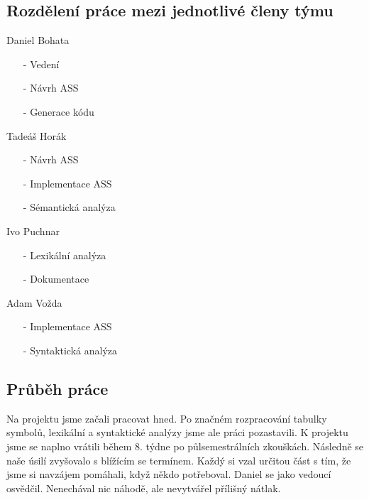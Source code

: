 \documentclass[a4paper, 12pt]{article}
\begin{document}
\subsection{Rozdělení práce mezi jednotlivé členy týmu}
\begin{itemize}
    \begin{minipage}{0.5\linewidth}   
        \item Daniel Bohata
        \begin{itemize}
        \item[-] Vedení
        \item[-] Návrh ASS
        \item[-] Generace kódu 
        \end{itemize}
        \item Tadeáš Horák
        \begin{itemize}
        \item[-] Návrh ASS
        \item[-] Implementace ASS
        \item[-] Sémantická analýza
        \end{itemize}
        \item Ivo Puchnar
        \begin{itemize}
        \item[-] Lexikální analýza
        \item[-] Dokumentace
        \end{itemize}
        \item Adam Vožda
        \begin{itemize}
        \item[-] Implementace ASS
        \item[-] Syntaktická analýza
        \end{itemize}
    \end{minipage}
\end{itemize}

\newpage
\subsection{Průběh práce}
Na projektu jsme začali pracovat hned. Po značném rozpracování tabulky symbolů, lexikální a syntaktické analýzy jsme ale práci pozastavili. K projektu jsme se naplno vrátili během 8. týdne po půlsemestrálních zkouškách. Následně se naše úsilí zvyšovalo s blížícím se termínem. Každý si vzal určitou část s tím, že jsme si navzájem pomáhali, když někdo potřeboval. Daniel se jako vedoucí osvědčil. Nenechával nic náhodě, ale nevytvářel přílišný nátlak.
\end{document}
